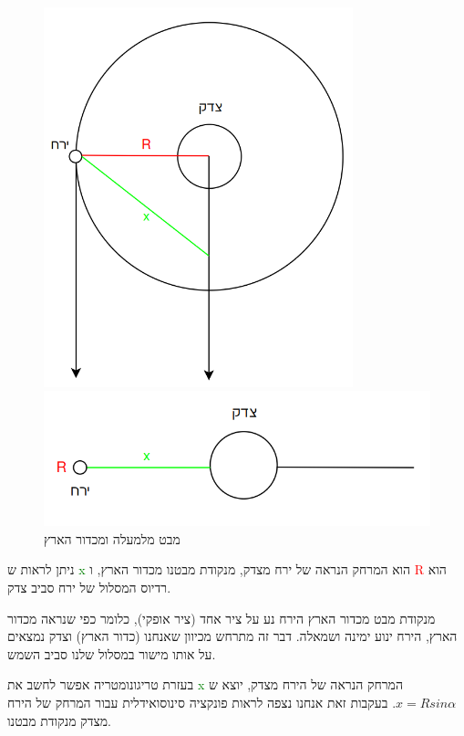 \documentclass[a4paper, 12pt]{article}
\begin{document}
    \begin{figure}[h!]
        \centering
        \begin{minipage}{0.4\textwidth}
            \centering
            \includegraphics[width=0.8\textwidth]{../assets/orbit_from_above_02.png}
        \end{minipage}\hfill
        \begin{minipage}{0.55\textwidth}
            \centering
            \includegraphics[width=\textwidth]{../assets/orbit_from_earth_02.png}
        \end{minipage}
        \caption{מבט מלמעלה ומכדור הארץ}
        \label{orbit_02}
    \end{figure}

    \begin{flushright}
        ניתן לראות ש \textcolor{green}{x} הוא המרחק הנראה של ירח מצדק,
        מנקודת מבטנו מכדור הארץ, ו \textcolor{red}{R} הוא רדיוס המסלול של ירח סביב צדק.

        מנקודת מבט מכדור הארץ הירח נע על ציר אחד (ציר אופקי), כלומר
        כפי שנראה מכדור הארץ, הירח ינוע ימינה ושמאלה.
        דבר זה מתרחש מכיוון שאנחנו (כדור הארץ) וצדק נמצאים על אותו מישור במסלול שלנו סביב השמש.
        
        בעזרת טריגונומטריה אפשר לחשב את \textcolor{green}{x} המרחק הנראה של הירח מצדק,
        יוצא ש
        $ x = Rsin{\alpha} $.
        בעקבות זאת אנחנו נצפה לראות פונקציה סינוסואידלית עבור המרחק של הירח מצדק 
        מנקודת מבטנו.
    \end{flushright}
\end{document}
